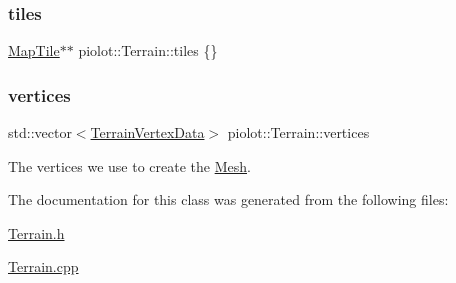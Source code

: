 \mbox{\label{classpiolot_1_1_terrain_a092c31b5d881c4f89dac30cd887d1664}} 
\subsubsection{\texorpdfstring{tiles}{tiles}}
{\footnotesize\ttfamily \mbox{\hyperlink{classpiolot_1_1_map_tile}{Map\+Tile}}$\ast$$\ast$ piolot\+::\+Terrain\+::tiles \{\}\hspace{0.3cm}{\ttfamily [private]}}

\mbox{\label{classpiolot_1_1_terrain_a57bd2f1b451a1d670bc5f42134ecf2c0}} 
\subsubsection{\texorpdfstring{vertices}{vertices}}
{\footnotesize\ttfamily std\+::vector$<$\mbox{\hyperlink{structpiolot_1_1_terrain_vertex_data}{Terrain\+Vertex\+Data}}$>$ piolot\+::\+Terrain\+::vertices\hspace{0.3cm}{\ttfamily [private]}}



The vertices we use to create the \mbox{\hyperlink{classpiolot_1_1_mesh}{Mesh}}. 



The documentation for this class was generated from the following files\+:\begin{DoxyCompactItemize}
\item 
\mbox{\hyperlink{_terrain_8h}{Terrain.\+h}}\item 
\mbox{\hyperlink{_terrain_8cpp}{Terrain.\+cpp}}\end{DoxyCompactItemize}
